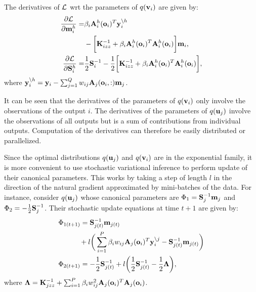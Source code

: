 \newcommand{\Lhi}{\calL^h_i}
\newcommand{\Kizz}{\mat{K}_{izz}}
\noindent The derivatives of $\calL$ wrt the parameters of $q(\v_i)$ are given by:
\newcommand{\ynoh}{\y_i^{\backslash h}}
\begin{align}
\nonumber
\deriv{\calL}{\mhi}
= & \beta_i \Ahi(\oi)^T \ynoh  \\
&- \bigg[\Kizz^{-1} +  \beta_i \Ahi(\oi)^T \Ahi(\oi) \bigg] \m_i \text{,} \\
\deriv{\calL}{\Shi} 
=& \frac{1}{2} \S_i^{-1} - \frac{1}{2} \bigg[ \Kizz^{-1} + \beta_i \Ahi(\oi)^T \Ahi(\oi) \bigg] ,
\end{align}
where $\ynoh = \y_i - \sum_{j=1}^Q w_{ij} \A_j(\oi,:) \m_j$.

\noindent It can be seen that the derivatives of the parameters of $q(\v_i)$ only involve the observations of the output $i$.
The derivatives of the parameters of $q(\u_j)$ involve the observations of all outputs but is a sum of contributions from individual outputs.
Computation of the derivatives can therefore be easily distributed or parallelized.

Since the optimal distributions $q(\u_j)$ and $q(\v_i)$ are in the exponential family, it is more convenient to use stochastic variational inference \citep{hensman2012fast,hensmangaussian} to perform update of their canonical parameters.
This works by taking a step of length $l$ in the direction of the natural gradient approximated by mini-batches of the data.
For instance, consider $q(\u_j)$ whose canonical parameters are $\Phi_1 = \S_j^{-1} \m_j$ and $\Phi_2 = -\frac{1}{2}\S_j^{-1}$.
Their stochastic update equations at time $t + 1$ are given by:
\begin{align}
\nonumber
& \Phi_{1(t+1)} = \S_{j(t)}^{-1} \m_{j(t)}  \\
 & \quad \qquad +  l \bigg(\sum_{i=1}^P \beta_i w_{ij} \A_j(\oi)^T \ynoj - \S_{j(t)}^{-1} \m_{j(t)} \bigg) \\
& \Phi_{2(t+1)} = -\frac{1}{2} \S_{j(t)}^{-1} + l \bigg(\frac{1}{2} \S_{j(t)}^{-1} - \frac{1}{2} \mat{\Lambda} \bigg),
\end{align}
\normalsize
where $\mat{\Lambda} = \Kjzz^{-1} + \sum_{i=1}^P \beta_i w_{ij}^2 \A_j(\oi)^T \A_j(\oi)$.
%
